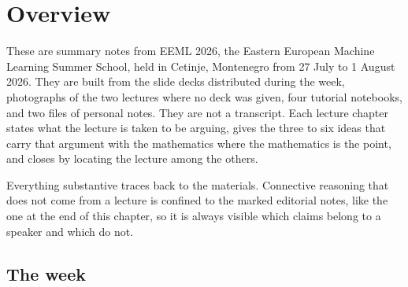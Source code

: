 \chapter{Overview}
\label{ch:00-overview}

These are summary notes from EEML 2026, the Eastern European Machine Learning Summer School, held in
Cetinje, Montenegro from 27 July to 1 August 2026. They are built from the slide decks distributed
during the week, photographs of the two lectures where no deck was given, four tutorial notebooks,
and two files of personal notes. They are not a transcript. Each lecture chapter states what the
lecture is taken to be arguing, gives the three to six ideas that carry that argument with the
mathematics where the mathematics is the point, and closes by locating the lecture among the
others.

Everything substantive traces back to the materials. Connective reasoning that does not come from a
lecture is confined to the marked editorial notes, like the one at the end of this chapter, so it is
always visible which claims belong to a speaker and which do not.

\section*{The week}


